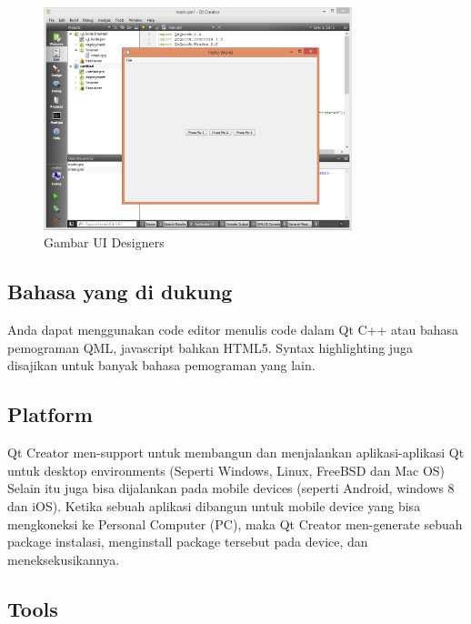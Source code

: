 \begin{figure}[htbp]
\centering
\includegraphics[width=0.8\textwidth]{images/capture1-3.png}
\caption{Gambar UI Designers}
\end{figure}\label{gambar-ui-designers}

\subsection{Bahasa yang di dukung}\label{bahasa-yang-di-dukung}

Anda dapat menggunakan code editor menulis code dalam Qt C++ atau bahasa
pemograman QML, javascript bahkan HTML5. Syntax highlighting juga
disajikan untuk banyak bahasa pemograman yang lain.

\subsection{Platform}\label{platform}

Qt Creator men-support untuk membangun dan menjalankan aplikasi-aplikasi
Qt untuk desktop environments (Seperti Windows, Linux, FreeBSD dan Mac
OS) Selain itu juga bisa dijalankan pada mobile devices (seperti
Android, windows 8 dan iOS). Ketika sebuah aplikasi dibangun untuk
mobile device yang bisa mengkoneksi ke Personal Computer (PC), maka Qt
Creator men-generate sebuah package instalasi, menginstall package
tersebut pada device, dan meneksekusikannya.

\subsection{Tools}\label{tools}

